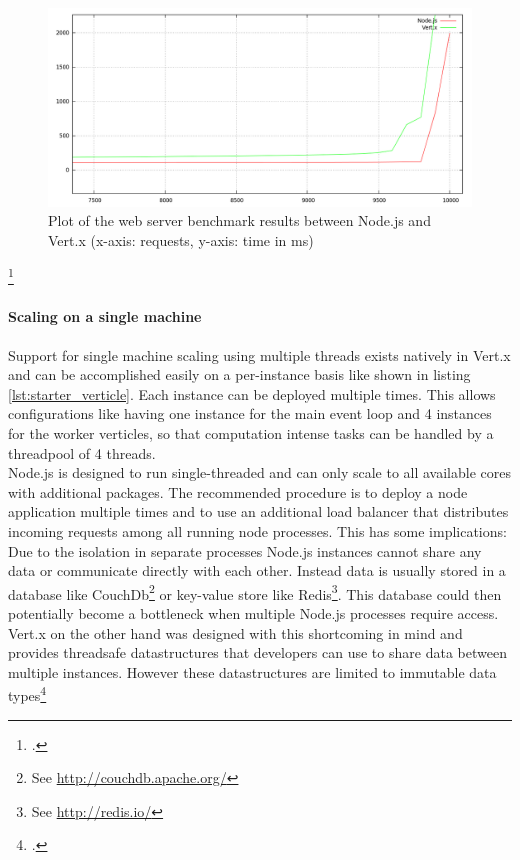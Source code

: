 \begin{figure}[htbp]
\centering
\includegraphics[width=\textwidth]{img/200kb_benchmark_node_vertx.png}
\caption[Plot of the web server benchmark results (asynchronous servers)]{Plot of the web server benchmark results between Node.js and Vert.x (x-axis: requests, y-axis: time in ms)}
\label{fig:benchmark_async}
\end{figure}
\footcitetext{req_res}


\paragraph{Scaling on a single machine}
Support for single machine scaling using multiple threads exists natively in
Vert.x and can be accomplished easily on a per-instance basis like shown in listing \ref{lst:starter_verticle}.
Each instance can
be deployed multiple times. This allows configurations like having one instance
for the main event loop and 4 instances for the worker verticles, so that
computation intense tasks can be handled by a threadpool of 4 threads.\\
Node.js is designed to run single-threaded and can only scale to all available
cores with additional packages. The recommended procedure is to deploy a node
application multiple times and to use an additional load balancer that
distributes incoming requests among all running node processes. This has some
implications:
Due to the isolation in separate processes Node.js instances cannot share any
data or communicate directly with each other.
Instead data is usually stored in a database like CouchDb\footnote{See
\url{http://couchdb.apache.org/}} or key-value store like Redis\footnote{See
\url{http://redis.io/}}.
This database could then potentially become a bottleneck when multiple Node.js
processes require access.\\
Vert.x on the other hand was designed with this shortcoming in mind and provides
threadsafe datastructures that developers can use to share data between multiple
instances. However these datastructures are limited to immutable data types\footcite[Cf.][]{vertx_2012}

